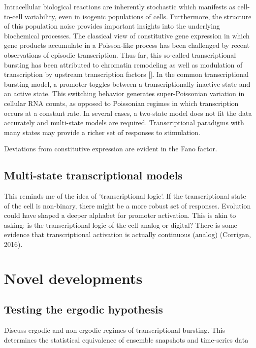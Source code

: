\documentclass{article}
\begin{document}
Intracellular biological reactions are inherently stochastic which manifests as cell-to-cell variability, even in isogenic populations of cells. Furthermore, 
the structure of this population noise provides important insights into the underlying biochemical processes. The classical view of constitutive gene expression in which gene products accumulate in a Poisson-like process has been challenged by recent observations of episodic transcription. Thus far, this so-called transcriptional bursting has been attributed to chromatin remodeling as well as modulation of transcription by upstream transcription factors []. In the common transcriptional bursting model, a promoter toggles between a transcriptionally inactive state and an active state. This switching behavior generates super-Poissonian variation in cellular RNA counts, as opposed to Poissonian regimes in which transcription occurs at a constant rate. In several cases, a two-state model does not fit the data accurately and multi-state models are required. Transcriptional paradigms with many states may provide a richer set of responses to stimulation. 

Deviations from constitutive expression are evident in the Fano factor. 

\subsection{Multi-state transcriptional models}

This reminds me of the idea of 'transcriptional logic'. If the transcriptional state of the cell is non-binary, there might be a more robust set of responses. Evolution could have shaped a deeper alphabet for promoter activation. This is akin to asking: is the transcriptional logic of the cell analog or digital? There is some evidence that transcriptional activation is actually continuous (analog) (Corrigan, 2016). 

\section{Novel developments}

\subsection{Testing the ergodic hypothesis}

Discuss ergodic and non-ergodic regimes of transcriptional bursting. This determines the statistical equivalence of ensemble snapshots and time-series data
\end{document}
